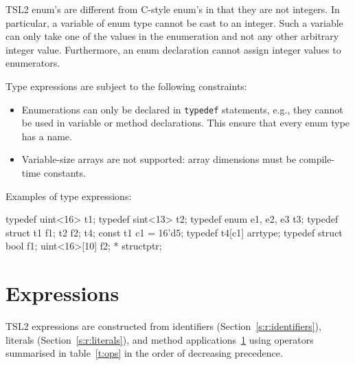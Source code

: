 \documentclass{report}
\newcommand{\src}[1]{\texttt{#1}}
\newcommand{\tsl}{TSL2 }
\begin{document}
\tsl enum's are different from C-style enum's in that they are not 
integers.  In particular, a variable of enum type cannot be cast 
to an integer.  Such a variable can only take one of the values in 
the enumeration and not any other arbitrary integer value.  
Furthermore, an enum declaration cannot assign integer values to 
enumerators.

Type expressions are subject to the following constraints:
\begin{itemize}
    \item Enumerations can only be declared in \src{typedef}
        statements, e.g., they cannot be used in variable or 
        method declarations.  This ensure that every enum type has 
        a name.
    \item Variable-size arrays are not supported: array dimensions 
        must be compile-time constants.
\end{itemize}

Examples of type expressions:

\begin{tsllisting}{}
typedef uint<16> t1;
typedef sint<13> t2;
typedef enum {e1, e2, e3} t3;
typedef struct {t1 f1; t2 f2;} t4;
const t1 c1 = 16'd5;
typedef t4[c1] arrtype;
typedef struct {bool f1; uint<16>[10] f2;} * structptr;
\end{tsllisting}

\section{Expressions}

\tsl expressions are constructed from identifiers 
(Section~\ref{s:r:identifiers}), literals
(Section~\ref{s:r:literals}), and method applications~\ref{} using 
operators summarised in table~\ref{t:ops} in the order of 
decreasing precedence.
\end{document}
